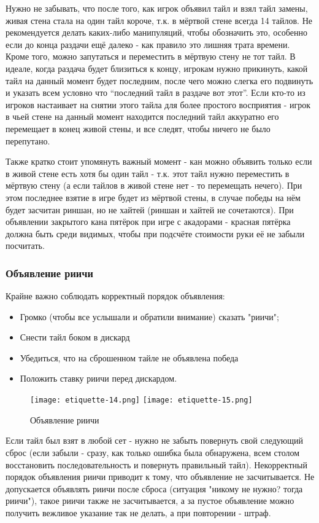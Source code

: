 Нужно не забывать, что после того, как игрок объявил тайл и взял тайл замены, живая стена стала на один тайл короче, т.к. в мёртвой стене всегда 14 тайлов. Не рекомендуется делать каких-либо манипуляций, чтобы обозначить это, особенно если до конца раздачи ещё далеко - как правило это лишняя трата времени. Кроме того, можно запутаться и переместить в мёртвую стену не тот тайл. В идеале, когда раздача будет близиться к концу, игрокам нужно прикинуть, какой тайл на данный момент будет последним, после чего можно слегка его подвинуть и указать всем условно что “последний тайл в раздаче вот этот”. Если кто-то из игроков настаивает на снятии этого тайла для более простого восприятия - игрок в чьей стене на данный момент находится последний тайл аккуратно его перемещает в конец живой стены, и все следят, чтобы ничего не было перепутано.

Также кратко стоит упомянуть важный момент - кан можно объявить только если в живой стене есть хотя бы один тайл - т.к. этот тайл нужно переместить в мёртвую стену (а если тайлов в живой стене нет - то перемещать нечего). При этом последнее взятие в игре будет из мёртвой стены, в случае победы на нём будет засчитан риншан, но не хайтей (риншан и хайтей не сочетаются). При объявлении закрытого кана пятёрок при игре с акадорами - красная пятёрка должна быть среди видимых, чтобы при подсчёте стоимости руки её не забыли посчитать.

\subsubsection{Объявление риичи}

Крайне важно соблюдать корректный порядок объявления: 
\begin{itemize}
	\item Громко (чтобы все услышали и обратили внимание) сказать "риичи";
	\item Снести тайл боком в дискард
	\item Убедиться, что на сброшенном тайле не объявлена победа
	\item Положить ставку риичи перед дискардом.
\end{itemize}

\begin{figure}[H]
	\centering
	\texttt{[image: etiquette-14.png]}
	\texttt{[image: etiquette-15.png]}
	\caption{Объявление риичи}
\end{figure}

Если тайл был взят в любой сет - нужно не забыть повернуть свой следующий сброс (если забыли - сразу, как только ошибка была обнаружена, всем столом восстановить последовательность и повернуть правильный тайл). Некорректный порядок объявления риичи приводит к тому, что объявление не засчитывается. Не допускается объявлять риичи после сброса (ситуация "никому не нужно? тогда риичи"), такое риичи также не засчитывается, а за пустое объявление можно получить вежливое указание так не делать, а при повторении - штраф. 

